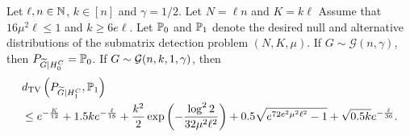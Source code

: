 \begin{proposition}\label{prop:reduction_gaussian}
Let $\ell, n \in {\mathbb{N}}$, $k \in [n]$ and $\gamma=1/2$. Let $N= \ell n$ and 
$K=k\ell$ Assume that 
$16 \mu^2 \ell \le 1$ and $k \geq 6e \ell$.
Let $\mathbb{P}_0$ and $\mathbb{P}_1$ denote the desired null and alternative distributions of the submatrix detection problem $(N,K,\mu)$. 
If $G \sim \mathcal{G}(n, \gamma)$, then  $P_{{\widetilde{G}}|H_0^C}=\mathbb{P}_0$.
If $G \sim {\mathcal{G}}(n,k,1,\gamma)$, then
\begin{align}
& d_{\rm TV} \left(P_{{\widetilde{G}}|H_1^C}, \mathbb{P}_1 \right)  \nonumber \\
& \le e^{-\frac{K}{12}} + 1.5 k e^{-\frac{\ell}{18}} + 
\frac{k^2}{2} \exp \left( - \frac{ \log^2 2 }{32 \mu^2 \ell^2} \right)
+ 0.5 \sqrt{e^{72e^2 \mu^2 \ell^2} -1} + \sqrt{0.5k} e^{-\frac{\ell}{36}}. \label{eq:defxi_gaussian}
\end{align}
\end{proposition}




